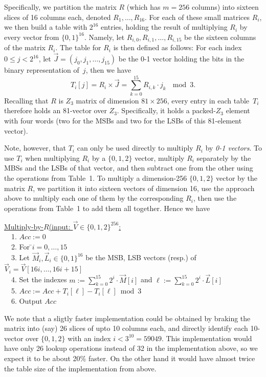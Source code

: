 Specifically, we partition the matrix $R$ (which has $m=256$ columns) into sixteen slices of 16 columns each, denoted $R_1,\ldots,R_{16}$.
For each of these small matrices $R_i$, we then build a table with $2^{16}$ entries, holding the result of multiplying $R_i$ by every vector from $\{0,1\}^{16}$.
Namely, let $R_{i,0},R_{i,1},\ldots,R_{i,15}$ be the sixteen columns of the matrix $R_i$.
The table for $R_i$ is then defined as follows: For each index $0\le j < 2^{16}$, let $\vec{J}=(j_0,j_1,\ldots,j_{15})$ be the 0-1 vector holding the bits in the binary representation of~$j$, then we have
\[
T_i[j] = R_i \times \vec{J} = \sum_{k=0}^{15} R_{i,k} \cdot j_k ~~\bmod 3.
\]
Recalling that $R$ is $Z_3$ matrix of dimension $81\times 256$, every entry in each table~$T_i$ therefore holds an 81-vector over $Z_3$.
Specifically, it holds a packed-$Z_3$ element with four words (two for the MSBs and two for the LSBs of this 81-element vector).

Note, however, that $T_i$ can only be used directly to multiply $R_i$ by \emph{0-1 vectors}.
To use $T_i$ when multiplying $R_i$ by a $\{0,1,2\}$ vector, multiply $R_i$ separately by the MBSs and the LSBs of that vector, and then subtract one from the other using the operations from Table~1.
To multiply a dimension-256 $\{0,1,2\}$ vector by the matrix $R$, we partition it into sixteen vectors of dimension 16, use the approach above to multiply each one of them by the corresponding $R_i$, then use the operations from Table~1 to add them all together.
Hence we have

\begin{tabbing}
	\underline{Multiply-by-$R$(input: $\vec{V}\in\{0,1,2\}^{256}$:}\\
	~~1. $Acc := 0$\\
	~~2. For \=$i=0,\ldots,15$\\
	~~3. \> Let $\vec{M}_i,\vec{L}_i\in\{0,1\}^{16}$ be the MSB, LSB vectors (resp.) of $\vec{V}_i=\vec{V}[16i,\ldots,16i+15]$\\
	~~4. \> Set the indexes $m:=\sum_{k=0}^{15}2^i\cdot\vec{M}[i]$
	and $\ell:=\sum_{k=0}^{15}2^i\cdot\vec{L}[i]$\\
	~~5. \> $Acc := Acc + T_i[\ell] - T_i[\ell] \bmod 3$\\
	~~6. Output $Acc$
\end{tabbing}

We note that a sligtly faster implementation could be obtained by braking the matrix into (say) 26 slices of upto 10 columns each, and directly identify each 10-vector over $\{0,1,2\}$ with an index $i<3^{10}=59049$.
This implementation would have only 26 lookup operations instead of 32 in the implementation above, so we expect it to be about 20\% faster. On the other hand it would have almost twice the table size of the implementation from above.


